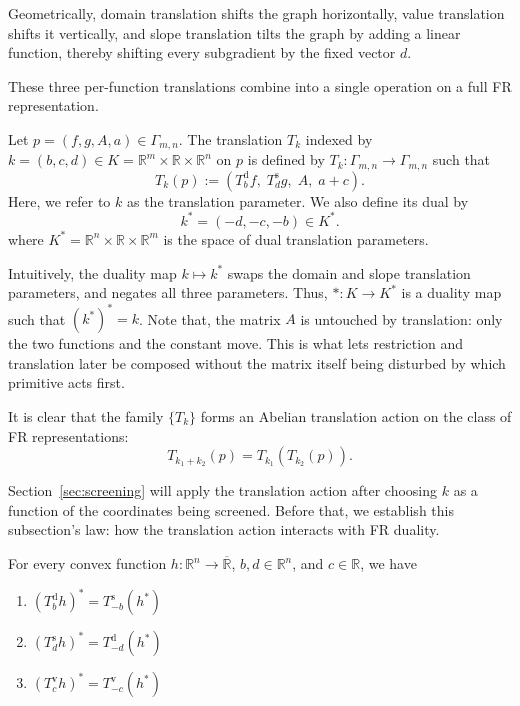 Geometrically, domain translation shifts the graph horizontally,
value translation shifts it vertically, and slope translation tilts
the graph by adding a linear function, thereby shifting every
subgradient by the fixed vector \(d\).

These three per-function translations combine into a single operation on a full FR representation.


\begin{definition}[Translation]
Let \(p=(f,g,A,a)\in \Gamma_{m, n}\). The translation $T_k$ indexed by \(k=(b,c,d) \in K = \mathbb{R}^m \times \mathbb{R} \times \mathbb{R}^n\) on \(p\) is defined by \(T_k : \Gamma_{m, n} \rightarrow \Gamma_{m, n} \) such that 
\[
T_k(p)
:=
(T^{\mathrm d}_bf,\;
T^{\mathrm s}_dg,\;
A,\;
a+c).
\]
Here, we refer to $k$ as the translation parameter. We also define its dual by \[k^*=(-d,-c,-b)\in K^*.\]
where \(K^*=\mathbb{R}^n \times \mathbb{R} \times \mathbb{R}^m\) is the space of dual translation parameters.
\end{definition}

Intuitively, the duality map \(k \mapsto k^*\) swaps the domain and slope translation parameters, and negates all three parameters.
Thus, $*: K \to K^*$ is a duality map such that \((k^*)^*=k\).
Note that, the matrix \(A\) is untouched by translation: only the two functions
and the constant move. This is what lets restriction and translation
later be composed without the matrix itself being disturbed by which
primitive acts first.

It is clear that the family \(\{T_k\}\) forms an Abelian translation action on the class of FR representations:
\[
T_{k_1+k_2}(p)
=
T_{k_1}(T_{k_2}(p)).
\]
 

Section~\ref{sec:screening} will apply the translation action after
choosing \(k\) as a function of the coordinates being screened. Before
that, we establish this subsection's law: how the translation action
interacts with FR duality.



\begin{proposition}
\label{prop:duality-of-primitive-translations}
For every convex function $h: \mathbb{R}^n \to \overline{\mathbb{R}}$, $b,d \in \mathbb{R}^n$, and $c \in \mathbb{R}$, we have 
\begin{enumerate}
    \item \((T^{\mathrm d}_b h)^* = T^{\mathrm s}_{-b}(h^*)\)
    \item \((T^{\mathrm s}_d h)^* = T^{\mathrm d}_{-d}(h^*)\)
    \item \((T^{\mathrm v}_c h)^* = T^{\mathrm v}_{-c}(h^*)\)
\end{enumerate}
\end{proposition}

